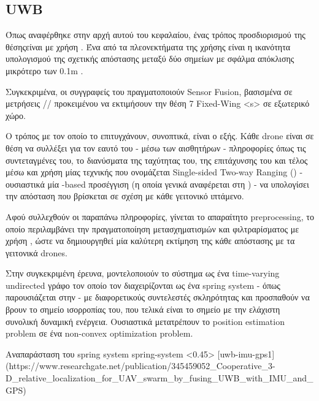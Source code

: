\subsection{UWB}
Όπως αναφέρθηκε στην αρχή αυτού του κεφαλαίου, ένας τρόπος προσδιορισμού της θέσης\udot είναι με χρήση .
Ένα από τα πλεονεκτήματα της χρήσης  είναι η ικανότητα υπολογισμού της σχετικής απόστασης μεταξύ δύο
σημείων με σφάλμα απόκλισης μικρότερο των 0.1m \cite{uwb-accuracy}.

Συγκεκριμένα, οι συγγραφείς του \cite{uwb-imu-gps1} πραγματοποιούν Sensor Fusion, βασισμένα σε μετρήσεις 
// προκειμένου να εκτιμήσουν την θέση 
7 Fixed-Wing <s> σε εξωτερικό χώρο.

Ο τρόπος με τον οποίο το επιτυγχάνουν, συνοπτικά, είναι ο εξής. Κάθε drone είναι σε θέση να συλλέξει για τον εαυτό του 
- μέσω των αισθητήρων - πληροφορίες όπως τις συντεταγμένες του, το διανύσματα της ταχύτητας του, της
επιτάχυνσης του και τέλος μέσω \udot και χρήση μίας τεχνικής που ονομάζεται Single-sided Two-way Ranging 
() - ουσιαστικά μία -based προσέγγιση (η οποία γενικά αναφέρεται 
στη ) - να υπολογίσει την απόσταση που βρίσκεται σε σχέση με κάθε γειτονικό ιπτάμενο.

Αφού συλλεχθούν οι παραπάνω πληροφορίες, γίνεται το απαραίτητο preprocessing, το οποίο περιλαμβάνει την πραγματοποίηση μετασχηματισμών
και φιλτραρίσματος με χρήση , ώστε να δημιουργηθεί μία καλύτερη εκτίμηση της κάθε απόστασης με τα γειτονικά drones.

Στην συγκεκριμένη έρευνα, μοντελοποιούν το σύστημα ως ένα time-varying undirected γράφο τον οποίο τον διαχειρίζονται ως ένα spring system - 
όπως παρουσιάζεται στην  - με διαφορετικούς συντελεστές σκληρότητας και προσπαθούν να βρουν το σημείο ισορροπίας του, 
που τελικά είναι το σημείο με την ελάχιστη συνολική δυναμική ενέργεια. Ουσιαστικά μετατρέπουν το position estimation problem σε ένα 
non-convex optimization problem.

{Αναπαράσταση του spring system}%
{spring-system}%
<0.45>%
[uwb-imu-gps1]%
(https://www.researchgate.net/publication/345459052_Cooperative_3-D_relative_localization_for_UAV_swarm_by_fusing_UWB_with_IMU_and_GPS)

